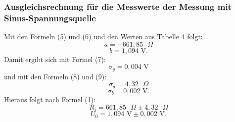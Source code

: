 \subsubsection{Ausgleichsrechnung für die Messwerte der Messung mit Sinus-Spannungsquelle}
Mit den Formeln (5) und (6) und den Werten aus Tabelle 4 folgt:
\begin{displaymath}
a=-661,85\text{ }\Omega
\end{displaymath}
\begin{displaymath}
b=1,094\text{ V.}
\end{displaymath}
Damit ergibt sich mit Formel (7):
\begin{displaymath}
\sigma_y=0,004\text{ V}
\end{displaymath}
und mit den Formeln (8) und (9):
\begin{displaymath}
\sigma_a=4,32\text{ }\Omega
\end{displaymath}
\begin{displaymath}
\sigma_b=0,002\text{ V.}
\end{displaymath}
Hieraus folgt nach Formel (1):
\begin{displaymath}
R_i=661,85\text{ }\Omega\pm 4,32\text{ }\Omega
\end{displaymath}
\begin{displaymath}
U_0=1,094\text{ V}\pm 0,002\text{ V.}
\end{displaymath}
























































